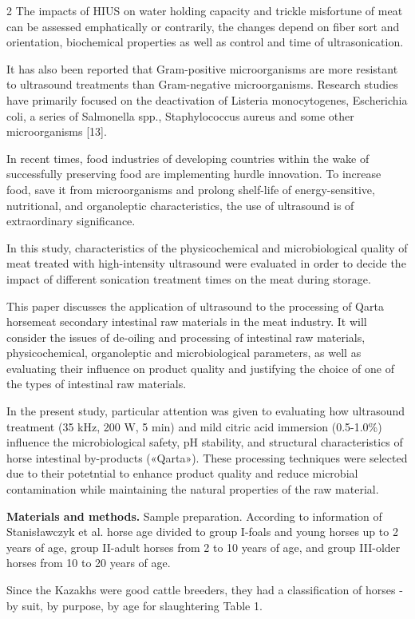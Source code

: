 \begin{multicols}{2}
The impacts of HIUS on water holding capacity and trickle misfortune
of meat can be assessed emphatically or contrarily, the changes depend
on fiber sort and orientation, biochemical properties as well as
control and time of ultrasonication.

It has also been reported that Gram-positive microorganisms are more
resistant to ultrasound treatments than Gram-negative microorganisms.
Research studies have primarily focused on the deactivation of Listeria
monocytogenes, Escherichia coli, a series of Salmonella spp.,
Staphylococcus aureus and some other microorganisms {[}13{]}.

In recent times, food industries of developing countries within the wake
of successfully preserving food are implementing hurdle innovation. To
increase food, save it from microorganisms and prolong shelf-life of
energy-sensitive, nutritional, and organoleptic characteristics, the use
of ultrasound is of extraordinary significance.

In this study, characteristics of the physicochemical and
microbiological quality of meat treated with high-intensity ultrasound
were evaluated in order to decide the impact of different sonication
treatment times on the meat during storage.

This paper discusses the application of ultrasound to the processing of
Qarta horsemeat secondary intestinal raw materials in the meat industry.
It will consider the issues of de-oiling and processing of intestinal
raw materials, physicochemical, organoleptic and microbiological
parameters, as well as evaluating their influence on product quality and
justifying the choice of one of the types of intestinal raw materials.

In the present study, particular attention was given to evaluating how
ultrasound treatment (35 kHz, 200 W, 5 min) and mild citric acid
immersion (0.5-1.0\%) influence the microbiological safety, pH
stability, and structural characteristics of horse intestinal
by-products («Qarta»). These processing techniques were selected due to
their potetntial to enhance product quality and reduce microbial
contamination while maintaining the natural properties of the raw
material.

{\bfseries Materials and methods.} Sample preparation. According to
information of Stanisławczyk et al. horse age divided to group I-foals
and young horses up to 2 years of age, group II-adult horses from 2 to
10 years of age, and group III-older horses from 10 to 20 years of age.~

Since the Kazakhs were good cattle breeders, they had a classification
of horses - by suit, by purpose, by age for slaughtering Table 1.
\end{multicols}

